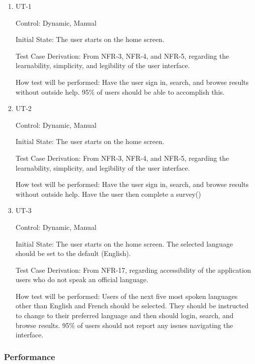 \documentclass[12pt, titlepage]{article}
\begin{document}
\begin{enumerate}

\item{UT-1}

Control: Dynamic, Manual
					
Initial State: The user starts on the home screen.

Test Case Derivation: From NFR-3, NFR-4, and NFR-5, regarding the learnability, simplicity, and legibility of the user interface.

How test will be performed: Have the user sign in, search, and browse results without outside help. 95\% of users should be able to accomplish this.


\item{UT-2}

Control: Dynamic, Manual
					
Initial State: The user starts on the home screen.

Test Case Derivation: From NFR-3, NFR-4, and NFR-5, regarding the learnability, simplicity, and legibility of the user interface.

How test will be performed: Have the user sign in, search, and browse results without outside help. 
Have the user then complete a survey()

\item{UT-3}

Control: Dynamic, Manual
					
Initial State: The user starts on the home screen. The selected language should be set to the default (English).

Test Case Derivation: From NFR-17, regarding accessibility of the application users who do not speak an official language.

How test will be performed: Users of the next five most spoken languages other than English and French should be selected. They should be instructed to change to their preferred language and then should login, search, and browse results. 95\% of users should not report any issues navigating the interface.


\end{enumerate}

\subsubsection{Performance}
		
\end{document}
